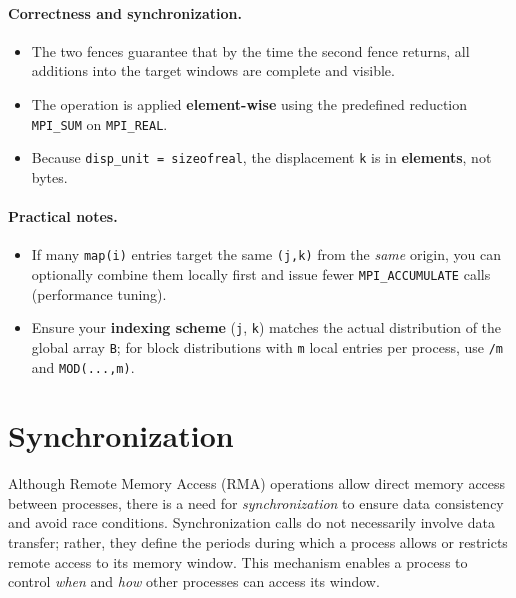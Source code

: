 \documentclass[12pt]{book}
\begin{document}
\paragraph{Correctness and synchronization.}
\begin{itemize}
    \item The two fences guarantee that by the time the second fence returns, all additions into the target windows are complete and visible.
    \item The operation is applied \textbf{element-wise} using the predefined reduction \texttt{MPI\_SUM} on \texttt{MPI\_REAL}.
    \item Because \texttt{disp\_unit = sizeofreal}, the displacement \texttt{k} is in \textbf{elements}, not bytes.
\end{itemize}

\paragraph{Practical notes.}
\begin{itemize}
    \item If many \texttt{map(i)} entries target the same \texttt{(j,k)} from the \emph{same} origin, you can optionally combine them locally first and issue fewer \texttt{MPI\_ACCUMULATE} calls (performance tuning).
    \item Ensure your \textbf{indexing scheme} (\texttt{j}, \texttt{k}) matches the actual distribution of the global array \texttt{B}; for block distributions with \texttt{m} local entries per process, use \texttt{/m} and \texttt{MOD(...,m)}.
\end{itemize}

\section{Synchronization}

Although Remote Memory Access (RMA) operations allow direct memory access between processes, there is a need for \emph{synchronization} to ensure data consistency and avoid race conditions. Synchronization calls do not necessarily involve data transfer; rather, they define the periods during which a process allows or restricts remote access to its memory window. This mechanism enables a process to control \emph{when} and \emph{how} other processes can access its window.
\end{document}
